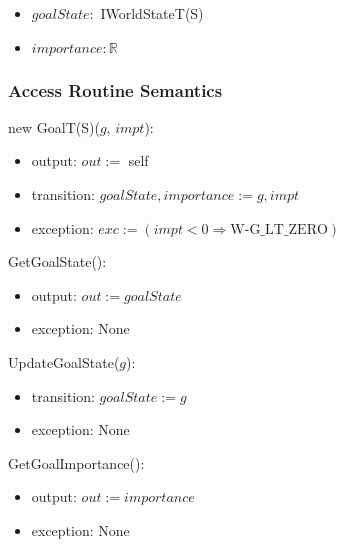\begin{itemize}

    \item $ \mathit{goalState} : $ IWorldStateT(S)

    \item $ \mathit{importance} : \mathbb{R} $

\end{itemize}

\clearpage
\subsubsection{Access Routine Semantics}

\noindent new GoalT(S)($g$, $\mathit{impt}$):
\begin{itemize}

    \item output: $out :=$ self

    \item transition: $ \mathit{goalState}, \mathit{importance} := g,
    \mathit{impt} $

    \item exception: $ exc := ( \mathit{impt} < 0 \Rightarrow
    \text{W-G\_LT\_ZERO} ) $

\end{itemize}

\noindent GetGoalState():
\begin{itemize}

    \item output: $out := \mathit{goalState}$

    \item exception: None

\end{itemize}

\noindent UpdateGoalState($g$):
\begin{itemize}

    \item transition: $ \mathit{goalState} := g $

    \item exception: None

\end{itemize}

\noindent GetGoalImportance():
\begin{itemize}

    \item output: $out := \mathit{importance}$

    \item exception: None

\end{itemize}

